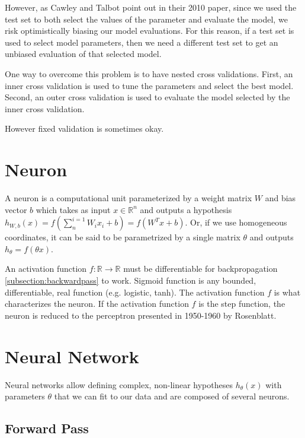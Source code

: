 However, as Cawley and Talbot point out in their 2010 paper, since we used the test set to both select the values of the parameter and evaluate the model, we risk optimistically biasing our model evaluations. For this reason, if a test set is used to select model parameters, then we need a different test set to get an unbiased evaluation of that selected model.

One way to overcome this problem is to have nested cross validations. First, an inner cross validation is used to tune the parameters and select the best model. Second, an outer cross validation is used to evaluate the model selected by the inner cross validation.

However fixed validation is sometimes okay.

\section{Neuron}

A neuron is a computational unit parameterized by a weight matrix $W$ and bias vector $b$ which takes as input $x \in \mathbb{R}^{n}$ and outputs a hypothesis $h_{W,b}(x) = f(\sum^{i=1}_{n} W_{i}x_{i} + b) = f(W^Tx + b)$. Or, if we use homogeneous coordinates, it can be said to be parametrized by a single matrix $\theta$ and outputs $h_{\theta} = f(\theta x)$.

An activation function $f \colon \mathbb{R} \to \mathbb{R}$ must be differentiable for backpropagation \ref{subsection:backwardpass} to work. Sigmoid function is any bounded, differentiable, real function (e.g. logistic, tanh).
The activation function $f$ is what characterizes the neuron. If the activation function $f$ is the step function, the neuron is reduced to the perceptron presented in 1950-1960 by Rosenblatt\cite{perceptron}.

\section{Neural Network}

Neural networks allow defining complex, non-linear hypotheses $h_\theta(x)$ with parameters $\theta$ that we can fit to our data and are composed of several neurons.

\subsection{Forward Pass}

